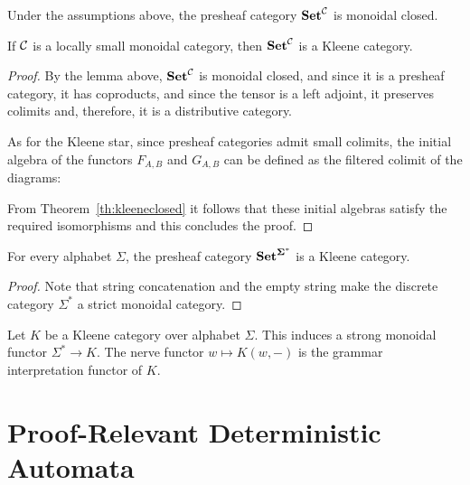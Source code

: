 \documentclass[acmsmall,anonymous,review,screen]{acmart}
\newcommand{\cat}[1]{
  \relax
  \StrLen{#1}[\arglength]
  \ifnum\arglength=1
  \mathcal{#1}
  \else
  \mathbf{#1}
  \fi
}
\newcommand{\Set}{\cat{Set}}
\newcommand{\grammar}{\Set^{\cat{\Sigma^*}}}
\begin{document}
\begin{lemma}
  Under the assumptions above, the presheaf category $\Set^{\cat{C}}$ is
  monoidal closed.
\end{lemma}

\begin{theorem}
  If $\cat{C}$ is a locally small monoidal category, then
  $\Set^{\cat{C}}$ is a Kleene category.
\end{theorem}
\begin{proof}
  By the lemma above, $\Set^{\cat{C}}$ is monoidal closed, and since it
  is a presheaf category, it has coproducts, and since the tensor
  is a left adjoint, it preserves colimits and, therefore, it is
  a distributive category.

  As for the Kleene star, since presheaf categories admit small colimits,
  the initial algebra of the functors $F_{A,B}$ and $G_{A,B}$ can be
  defined as the filtered colimit of the diagrams:

  From Theorem~\ref{th:kleeneclosed} it follows that these initial
  algebras satisfy the required isomorphisms and this concludes the
  proof.
\end{proof}

\begin{corollary}
  For every alphabet $\Sigma$, the presheaf category $\grammar$
  is a Kleene category.
\end{corollary}
\begin{proof}
  Note that string concatenation and the empty string make the
  discrete category $\Sigma^*$ a strict monoidal category.
\end{proof}

\begin{definition}
  Let $K$ be a Kleene category over alphabet $\Sigma$. This
  induces a strong monoidal functor $\Sigma^* \to K$. The
  nerve functor $w \mapsto K(w, -)$ is the grammar interpretation
  functor of $K$.
\end{definition}

\section{Proof-Relevant Deterministic Automata}
\end{document}
